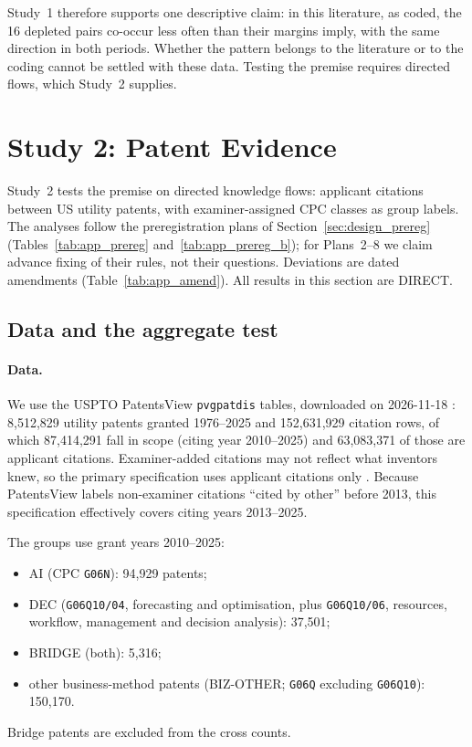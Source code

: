 Study~1 therefore supports one descriptive claim: in this literature, as coded, the 16 depleted pairs co-occur less often than their margins imply, with the same direction in both periods. Whether the pattern belongs to the literature or to the coding cannot be settled with these data. Testing the premise requires directed flows, which Study~2 supplies.


\section{Study 2: Patent Evidence}
\label{sec:study2}

Study~2 tests the premise on directed knowledge flows: applicant citations between US utility patents, with examiner-assigned CPC classes as group labels. The analyses follow the preregistration plans of Section~\ref{sec:design_prereg} (Tables~\ref{tab:app_prereg} and~\ref{tab:app_prereg_b}); for Plans~2--8 we claim advance fixing of their rules, not their questions. Deviations are dated amendments (Table~\ref{tab:app_amend}). All results in this section are DIRECT.

\subsection{Data and the aggregate test}
\label{sec:study2_aggregate}

\paragraph{Data.} We use the USPTO PatentsView \texttt{pvgpatdis} tables, downloaded on 2026-11-18 \citep{uspto2026patentsview}: 8,512,829 utility patents granted 1976--2025 and 152,631,929 citation rows, of which 87,414,291 fall in scope (citing year 2010--2025) and 63,083,371 of those are applicant citations. Examiner-added citations may not reflect what inventors knew, so the primary specification uses applicant citations only \citep{alcacer2006patent}. Because PatentsView labels non-examiner citations ``cited by other'' before 2013, this specification effectively covers citing years 2013--2025.

The groups use grant years 2010--2025:
\begin{itemize}
  \item AI (CPC \texttt{G06N}): 94,929 patents;
  \item DEC (\texttt{G06Q10/04}, forecasting and optimisation, plus \texttt{G06Q10/06}, resources, workflow, management and decision analysis): 37,501;
  \item BRIDGE (both): 5,316;
  \item other business-method patents (BIZ-OTHER; \texttt{G06Q} excluding \texttt{G06Q10}): 150,170.
\end{itemize}
Bridge patents are excluded from the cross counts.

